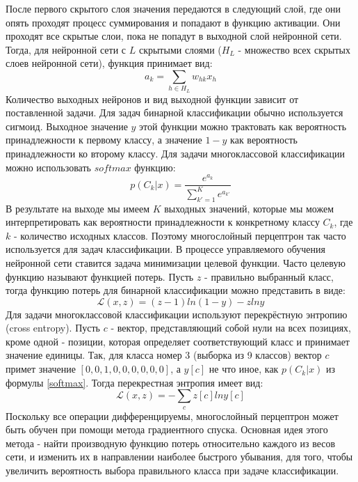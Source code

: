     После первого скрытого слоя значения передаются в следующий слой, где они опять проходят процесс суммирования и попадают в функцию активации. Они проходят все скрытые слои, пока не попадут в выходной слой нейронной сети. Тогда, для нейронной сети с $L$ скрытыми слоями ($H_{L}$ - множество всех скрытых слоев нейронной сети), функция принимает вид:
    \begin{equation}
    a_{k}=\sum_{h\in  H_{L}}w_{hk}x_{h}
    \end{equation}
    Количество выходных нейронов и вид выходной функции зависит от поставленной задачи. Для задач бинарной классификации обычно используется сигмоид. Выходное значение $y$ этой функции можно трактовать как вероятность принадлежности к первому классу, а значение $1-y$ как вероятность принадлежности ко второму классу.
    Для задачи многоклассовой классификации можно использовать $softmax$ функцию:
    \begin{equation}\label{softmax}
    p(C_{k}|x)=\frac{e^{a_{k}}}{\sum_{k{}'=1}^{K}e^{a_{k{}'}}}
    \end{equation}
    В результате на выходе мы имеем $K$ выходных значений, которые мы можем интерпретировать как вероятности принадлежности к конкретному классу $C_{k}$, где $k$ - количество исходных классов. Поэтому многослойный перцептрон так часто используется для задач классификации. В процессе управляемого обучения нейронной сети ставится задача минимизации целевой функции.
    Часто целевую функцию называют функцией потерь. Пусть $z$ - правильно выбранный класс, тогда функцию потерь для бинарной классификации можно представить в виде:
    \begin{equation}
    \mathcal{L}(x,z) = (z-1)ln(1-y)-zlny
    \end{equation}
    Для задачи многоклассовой классификации используют перекрёстную энтропию (cross entropy). Пусть $c$ - вектор, представляющий собой нули на всех позициях, кроме одной - позиции, которая определяет соответствующий класс и принимает значение единицы. Так, для класса номер 3 (выборка из 9 классов) вектор $c$ примет значение $[0,0,1,0,0,0,0,0,0]$, а $y[c]$ не что иное, как $p(C_{k}|x)$ из формулы \ref{softmax}. Тогда перекрестная энтропия имеет вид:
    \begin{equation}
    \mathcal{L}(x,z) = -\sum_{c}{z[c] ln y[c]}
    \end{equation}
    Поскольку все операции дифференцируемы, многослойный перцептрон может быть обучен при помощи метода градиентного спуска. Основная идея этого метода - найти производную функцию потерь относительно каждого из весов сети, и изменить их в направлении наиболее быстрого убывания, для того, чтобы увеличить вероятность выбора правильного класса при задаче классификации. 

